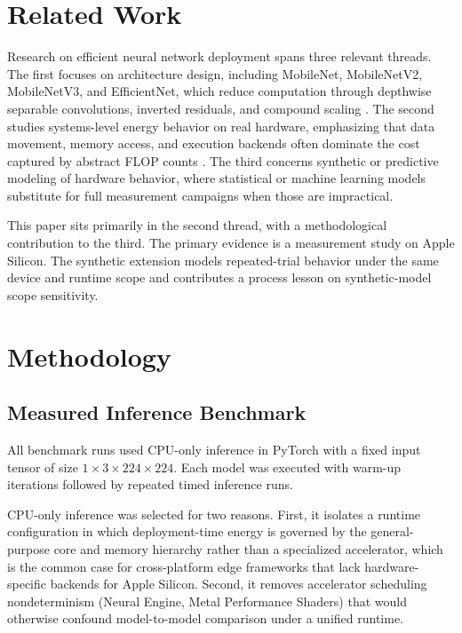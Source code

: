 \documentclass[conference]{IEEEtran}
\begin{document}
\section{Related Work}
Research on efficient neural network deployment spans three relevant threads.
The first focuses on architecture design, including MobileNet, MobileNetV2,
MobileNetV3, and EfficientNet, which reduce computation through depthwise
separable convolutions, inverted residuals, and compound scaling
\cite{mobilenet2017,mobilenetv22018,mobilenetv32019,efficientnet2019}. The
second studies systems-level energy behavior on real hardware, emphasizing
that data movement, memory access, and execution backends often dominate the
cost captured by abstract FLOP counts
\cite{horowitz2014,mittal2019,eyeriss2017,hardwareaware2019}. The third
concerns synthetic or predictive modeling of hardware behavior, where
statistical or machine learning models substitute for full measurement
campaigns when those are impractical.

This paper sits primarily in the second thread, with a methodological
contribution to the third. The primary evidence is a measurement study on
Apple Silicon. The synthetic extension models repeated-trial behavior under
the same device and runtime scope and contributes a process lesson on
synthetic-model scope sensitivity.

\section{Methodology}

\subsection{Measured Inference Benchmark}
All benchmark runs used CPU-only inference in PyTorch with a fixed input
tensor of size $1 \times 3 \times 224 \times 224$. Each model was executed
with warm-up iterations followed by repeated timed inference runs.

CPU-only inference was selected for two reasons. First, it isolates a runtime
configuration in which deployment-time energy is governed by the general-purpose
core and memory hierarchy rather than a specialized accelerator, which is the
common case for cross-platform edge frameworks that lack hardware-specific
backends for Apple Silicon. Second, it removes accelerator scheduling
nondeterminism (Neural Engine, Metal Performance Shaders) that would otherwise
confound model-to-model comparison under a unified runtime.
\end{document}
